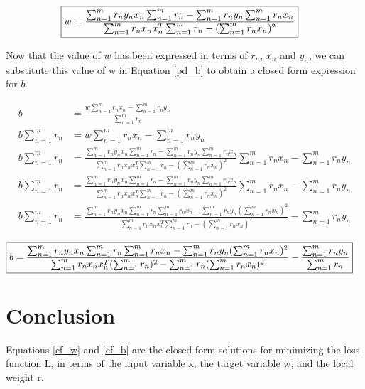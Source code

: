 \documentclass[a4paper]{article}
\begin{document}
\begin{align}
\label{cf_w}
	\Aboxed{w  = \frac{\sum_{n=1}^m  r_n y_n x_n \sum_{n=1}^m  r_n - \sum_{n=1}^m  r_n y_n \sum_{n=1}^m  r_n x_n}{\sum_{n=1}^m r_n x_n x_n^T \sum_{n=1}^m  r_n - ({\sum_{n=1}^m r_n x_n})^2}}
\end{align}

\vspace{10mm}

Now that the value of $w$ has been expressed in terms of $r_n$, $x_n$ and $y_n$, we can substitute this value of w in Equation \ref{pd_b} to obtain a closed form expression for $b$.

\begin{align*}
	b &= \frac{w \sum_{n=1}^m r_n x_n - \sum_{n=1}^m  r_n y_n}{\sum_{n=1}^m  r_n} \\
	b \sum_{n=1}^m  r_n &= w \sum_{n=1}^m r_n x_n - \sum_{n=1}^m  r_n y_n\\
	b \sum_{n=1}^m  r_n &= \frac{\sum_{n=1}^m  r_n y_n x_n \sum_{n=1}^m  r_n - \sum_{n=1}^m  r_n y_n \sum_{n=1}^m  r_n x_n}{\sum_{n=1}^m r_n x_n x_n^T \sum_{n=1}^m  r_n - ({\sum_{n=1}^m r_n x_n})^2} \sum_{n=1}^m r_n x_n - \sum_{n=1}^m  r_n y_n\\
	b \sum_{n=1}^m  r_n &= \frac{\sum_{n=1}^m  r_n y_n x_n \sum_{n=1}^m  r_n - \sum_{n=1}^m  r_n y_n \sum_{n=1}^m  r_n x_n}{\sum_{n=1}^m r_n x_n x_n^T \sum_{n=1}^m  r_n - ({\sum_{n=1}^m r_n x_n})^2} \sum_{n=1}^m r_n x_n - \sum_{n=1}^m  r_n y_n\\
	b \sum_{n=1}^m  r_n &= \frac{\sum_{n=1}^m  r_n y_n x_n \sum_{n=1}^m  r_n \sum_{n=1}^m r_n x_n - \sum_{n=1}^m  r_n y_n (\sum_{n=1}^m  r_n x_n)^2}{\sum_{n=1}^m r_n x_n x_n^T \sum_{n=1}^m  r_n - ({\sum_{n=1}^m r_n x_n})^2} - \sum_{n=1}^m  r_n y_n
\end{align*}

\begin{align}
\label{cf_b}
	\Aboxed{b &= \frac{\sum_{n=1}^m r_n y_n x_n \sum_{n=1}^m r_n \sum_{n=1}^mr_n x_n - \sum_{n=1}^m r_n y_n (\sum_{n=1}^m r_n x_n)^2}{\sum_{n=1}^mr_n x_n x_n^T (\sum_{n=1}^m r_n)^2 - \sum_{n=1}^m r_n ({\sum_{n=1}^mr_n x_n})^2} - \frac{\sum_{n=1}^m r_n y_n}{\sum_{n=1}^m r_n}}
\end{align}

\vspace{5mm}

\section{Conclusion}
Equations \ref{cf_w} and \ref{cf_b} are the closed form solutions for minimizing the loss function L, in terms of the input variable x, the target variable w, and the local weight r.
\end{document}
